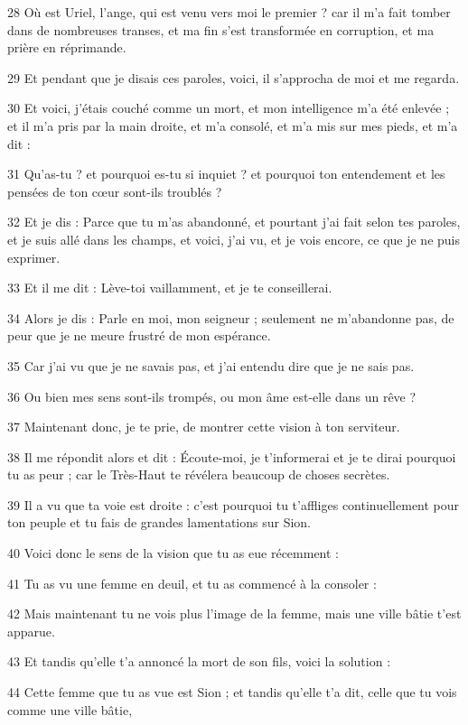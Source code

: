 \par 28 Où est Uriel, l'ange, qui est venu vers moi le premier ? car il m'a fait tomber dans de nombreuses transes, et ma fin s'est transformée en corruption, et ma prière en réprimande.
\par 29 Et pendant que je disais ces paroles, voici, il s'approcha de moi et me regarda.
\par 30 Et voici, j'étais couché comme un mort, et mon intelligence m'a été enlevée ; et il m'a pris par la main droite, et m'a consolé, et m'a mis sur mes pieds, et m'a dit :
\par 31 Qu'as-tu ? et pourquoi es-tu si inquiet ? et pourquoi ton entendement et les pensées de ton cœur sont-ils troublés ?
\par 32 Et je dis : Parce que tu m'as abandonné, et pourtant j'ai fait selon tes paroles, et je suis allé dans les champs, et voici, j'ai vu, et je vois encore, ce que je ne puis exprimer.
\par 33 Et il me dit : Lève-toi vaillamment, et je te conseillerai.
\par 34 Alors je dis : Parle en moi, mon seigneur ; seulement ne m'abandonne pas, de peur que je ne meure frustré de mon espérance.
\par 35 Car j'ai vu que je ne savais pas, et j'ai entendu dire que je ne sais pas.
\par 36 Ou bien mes sens sont-ils trompés, ou mon âme est-elle dans un rêve ?
\par 37 Maintenant donc, je te prie, de montrer cette vision à ton serviteur.
\par 38 Il me répondit alors et dit : Écoute-moi, je t'informerai et je te dirai pourquoi tu as peur ; car le Très-Haut te révélera beaucoup de choses secrètes.
\par 39 Il a vu que ta voie est droite : c'est pourquoi tu t'affliges continuellement pour ton peuple et tu fais de grandes lamentations sur Sion.
\par 40 Voici donc le sens de la vision que tu as eue récemment :
\par 41 Tu as vu une femme en deuil, et tu as commencé à la consoler :
\par 42 Mais maintenant tu ne vois plus l'image de la femme, mais une ville bâtie t'est apparue.
\par 43 Et tandis qu'elle t'a annoncé la mort de son fils, voici la solution :
\par 44 Cette femme que tu as vue est Sion ; et tandis qu'elle t'a dit, celle que tu vois comme une ville bâtie,
